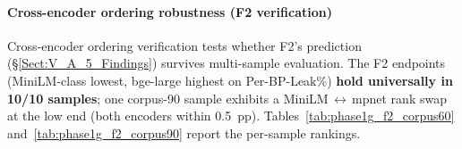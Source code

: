 \documentclass[journal]{IEEEtran}
\begin{document}
\begin{table}[!t]
    \centering
    \caption{Secondary paired $t$-tests (Bypass and Per-BP-Leak, descriptive). Bypass-rate tests produce degenerate $\pm\infty$ $t$-statistics because the pre-LLM gate is deterministic (paired-difference std $= 0$); mean differences are reported instead.}
    \label{tab:phase1g_paired_secondary}
\end{table}

\paragraph{Cross-encoder ordering robustness (F2 verification)}
Cross-encoder ordering verification tests whether F2's prediction (\S\ref{Sect:V_A_5_Findings}) survives multi-sample evaluation. The F2 endpoints (MiniLM-class lowest, bge-large highest on Per-BP-Leak\%) \textbf{hold universally in 10/10 samples}; one corpus-90 sample exhibits a MiniLM\,$\leftrightarrow$\,mpnet rank swap at the low end (both encoders within 0.5~pp). Tables~\ref{tab:phase1g_f2_corpus60} and~\ref{tab:phase1g_f2_corpus90} report the per-sample rankings.
\end{document}
